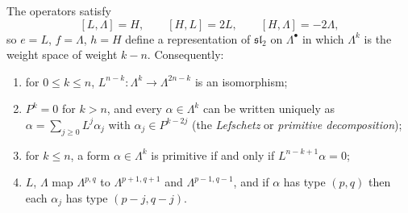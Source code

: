\begin{theorem}\label{kahler:theorem-sl2-forms}
The operators satisfy
\[
[L, \Lambda] = H, \qquad [H, L] = 2L, \qquad [H, \Lambda] = -2\Lambda,
\]
so $e = L$, $f = \Lambda$, $h = H$ define a representation of $\mathfrak{sl}_2$ on $\Lambda^\bullet$ in which $\Lambda^k$ is the weight space of
weight $k - n$. Consequently:
\begin{enumerate}
\item for $0 \leq k \leq n$, $L^{n-k} \colon \Lambda^k \to \Lambda^{2n-k}$ is an isomorphism;
\item $P^k = 0$ for $k > n$, and every $\alpha \in \Lambda^k$ can be written uniquely as $\alpha = \sum_{j \geq 0}L^j\alpha_j$ with
$\alpha_j \in P^{k-2j}$ (the \emph{Lefschetz} or \emph{primitive decomposition});
\item for $k \leq n$, a form $\alpha \in \Lambda^k$ is primitive if and only if $L^{n-k+1}\alpha = 0$;
\item $L$, $\Lambda$ map $\Lambda^{p,q}$ to $\Lambda^{p+1,q+1}$ and $\Lambda^{p-1,q-1}$, and if $\alpha$ has type $(p,q)$ then each
$\alpha_j$ has type $(p - j, q - j)$.
\end{enumerate}
\end{theorem}

